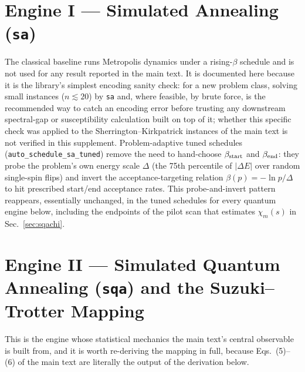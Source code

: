 \documentclass[11pt]{article}
\newcommand{\chim}{\chi_{m}}
\begin{document}
\section{Engine I --- Simulated Annealing (\texttt{sa})}
\label{sec:sa}

The classical baseline runs Metropolis dynamics under a rising-$\beta$ schedule and is not used
for any result reported in the main text. It is documented here because it is the library's
simplest encoding sanity check: for a new problem class, solving small instances ($n\lesssim20$)
by \texttt{sa} and, where feasible, by brute force, is the recommended way to catch an encoding
error before trusting any downstream spectral-gap or susceptibility calculation built on top of
it; whether this specific check was applied to the Sherrington--Kirkpatrick instances of the main
text is not verified in this supplement. Problem-adaptive tuned schedules
(\texttt{auto\_schedule\_sa\_tuned}) remove the need to hand-choose $\beta_{\rm start}$ and
$\beta_{\rm end}$: they probe the problem's own energy scale $\Delta$ (the 75th percentile of
$|\Delta E|$ over random single-spin flips) and invert the acceptance-targeting relation
$\beta(p)=-\ln p/\Delta$ to hit prescribed start/end acceptance rates. This probe-and-invert
pattern reappears, essentially unchanged, in the tuned schedules for every quantum engine below,
including the endpoints of the pilot scan that estimates $\chim(s)$ in Sec.~\ref{sec:sqachi}.

\section{Engine II --- Simulated Quantum Annealing (\texttt{sqa}) and the Suzuki--Trotter Mapping}
\label{sec:sqa}

This is the engine whose statistical mechanics the main text's central observable is built from,
and it is worth re-deriving the mapping in full, because Eqs.~(5)--(6) of the main text are
literally the output of the derivation below.
\end{document}
